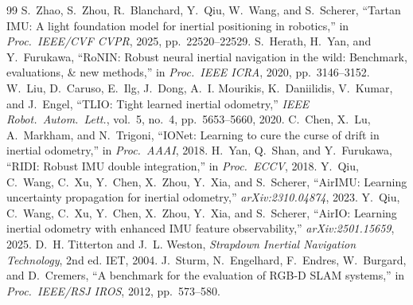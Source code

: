 \documentclass[letterpaper,10pt,conference]{ieeeconf}
\begin{document}
\begin{thebibliography}{99}
 S.~Zhao, S.~Zhou, R.~Blanchard, Y.~Qiu, W.~Wang, and S.~Scherer, ``Tartan IMU: A light foundation
model for inertial positioning in robotics,'' in \emph{Proc.\ IEEE/CVF CVPR}, 2025, pp.~22520--22529.
 S.~Herath, H.~Yan, and Y.~Furukawa, ``RoNIN: Robust neural inertial navigation in the wild: Benchmark,
evaluations, \& new methods,'' in \emph{Proc.\ IEEE ICRA}, 2020, pp.~3146--3152.
 W.~Liu, D.~Caruso, E.~Ilg, J.~Dong, A.~I. Mourikis, K.~Daniilidis, V.~Kumar, and J.~Engel, ``TLIO: Tight
learned inertial odometry,'' \emph{IEEE Robot.\ Autom.\ Lett.}, vol.~5, no.~4, pp.~5653--5660, 2020.
 C.~Chen, X.~Lu, A.~Markham, and N.~Trigoni, ``IONet: Learning to cure the curse of drift in inertial
odometry,'' in \emph{Proc.\ AAAI}, 2018.
 H.~Yan, Q.~Shan, and Y.~Furukawa, ``RIDI: Robust IMU double integration,'' in \emph{Proc.\ ECCV}, 2018.
 Y.~Qiu, C.~Wang, C.~Xu, Y.~Chen, X.~Zhou, Y.~Xia, and S.~Scherer, ``AirIMU: Learning uncertainty
propagation for inertial odometry,'' \emph{arXiv:2310.04874}, 2023.
 Y.~Qiu, C.~Wang, C.~Xu, Y.~Chen, X.~Zhou, Y.~Xia, and S.~Scherer, ``AirIO: Learning inertial odometry
with enhanced IMU feature observability,'' \emph{arXiv:2501.15659}, 2025.
 D.~H. Titterton and J.~L. Weston, \emph{Strapdown Inertial Navigation Technology}, 2nd ed.
IET, 2004.
 J.~Sturm, N.~Engelhard, F.~Endres, W.~Burgard, and D.~Cremers, ``A benchmark for the
evaluation of RGB-D SLAM systems,'' in \emph{Proc.\ IEEE/RSJ IROS}, 2012, pp.~573--580.
\end{thebibliography}
\end{document}
